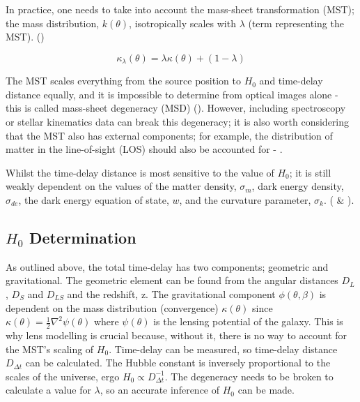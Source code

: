 \documentclass[12pt]{report}
\begin{document}
\vspace{10mm}

In practice, one needs to take into account the mass-sheet transformation (MST); the mass distribution, $k(\theta)$, isotropically scales with $\lambda$ (term representing the MST). (\textcite{Falco1985})

\begin{equation*}
    \kappa_{\lambda}(\theta) = \lambda \kappa(\theta) + (1 - \lambda)
\end{equation*}

The MST scales everything from the source position to $H_{0}$ and time-delay distance equally, and it is impossible to determine from optical images alone - this is called mass-sheet degeneracy (MSD) (\textcite{Schneider2013}). However, including spectroscopy or stellar kinematics data can break this degeneracy; it is also worth considering that the MST also has external components; for example, the distribution of matter in the line-of-sight (LOS) should also be accounted for - \textcite{Rusu2017}.

Whilst the time-delay distance is most sensitive to the value of $H_{0}$; it is still weakly dependent on the values of the matter density, $\sigma_{m}$, dark energy density, $\sigma_{de}$, the dark energy equation of state, $w$, and the curvature parameter, $\sigma_{k}$. (\textcite{Suyu2010} \& \textcite{Linder2011}).


\subsection{$H_{0}$ Determination}

As outlined above, the total time-delay has two components; geometric and gravitational. The geometric element can be found from the angular distances $D_{L}$, $D_{S}$ and $D_{LS}$ and the redshift, z. The gravitational component $\phi(\theta, \beta)$ is dependent on the mass distribution (convergence) $\kappa(\theta)$ since $\kappa(\theta) = \frac{1}{2}\nabla^{2}\psi({\theta})$ where $\psi({\theta})$ is the lensing potential of the galaxy. This is why lens modelling is crucial because, without it, there is no way to account for the MST's scaling of $H_{0}$. Time-delay can be measured, so time-delay distance $D_{\Delta t}$ can be calculated. The Hubble constant is inversely proportional to the scales of the universe, ergo $H_{0} \propto D_{\Delta t}^{-1}$. The degeneracy needs to be broken to calculate a value for $\lambda$, so an accurate inference of $H_{0}$ can be made.
\end{document}
